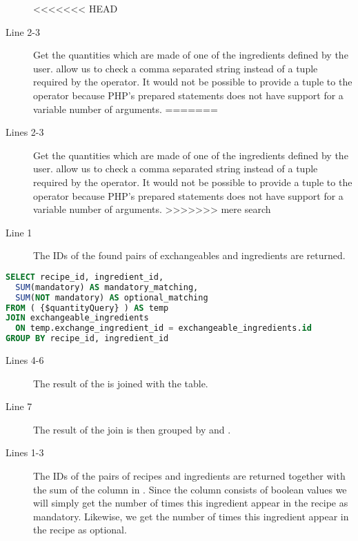 \begin{description}
<<<<<<< HEAD
\item[Line 2-3] Get the quantities which are made of one of the ingredients defined by the user.  allow us to check a comma separated string instead of a tuple required by the  operator. It would not be possible to provide a tuple to the  operator because PHP's prepared statements does not have support for a variable number of arguments.
=======
\item[Lines 2-3] Get the quantities which are made of one of the ingredients defined by the user.  allow us to check a comma separated string instead of a tuple required by the  operator. It would not be possible to provide a tuple to the  operator because PHP's prepared statements does not have support for a variable number of arguments.
>>>>>>> mere search
\item[Line 1] The IDs of the found pairs of exchangeables and ingredients are returned.
\end{description}



\begin{lstlisting}[language=SQL, float=h, label={}, caption={\$ingredientQuery, get the number of times the individual ingredients appear in each recipe.}]
SELECT recipe_id, ingredient_id,
  SUM(mandatory) AS mandatory_matching,
  SUM(NOT mandatory) AS optional_matching
FROM ( {$quantityQuery} ) AS temp
JOIN exchangeable_ingredients
  ON temp.exchange_ingredient_id = exchangeable_ingredients.id
GROUP BY recipe_id, ingredient_id
\end{lstlisting}

\begin{description}
\item[Lines 4-6] The result of the  is joined with the  table.
\item[Line 7] The result of the join is then grouped by  and .
\item[Lines 1-3] The IDs of the pairs of recipes and ingredients are returned together with the sum of the  column in . Since the  column consists of boolean values we will simply get the number of times this ingredient appear in the recipe as mandatory. Likewise, we get the number of times this ingredient appear in the recipe as optional.
\end{description}



